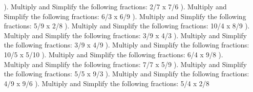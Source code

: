 \documentclass{article}%
\begin{document}
). Multiply and Simplify the following fractions: 2/7 x 7/6%
\newline%
\newline%
). Multiply and Simplify the following fractions: 6/3 x 6/9%
\newline%
\newline%
). Multiply and Simplify the following fractions: 5/9 x 2/8%
\newline%
\newline%
). Multiply and Simplify the following fractions: 10/4 x 8/9%
\newline%
\newline%
). Multiply and Simplify the following fractions: 3/9 x 4/3%
\newline%
\newline%
). Multiply and Simplify the following fractions: 3/9 x 4/9%
\newline%
\newline%
). Multiply and Simplify the following fractions: 10/5 x 5/10%
\newline%
\newline%
). Multiply and Simplify the following fractions: 6/4 x 9/8%
\newline%
\newline%
). Multiply and Simplify the following fractions: 7/7 x 5/9%
\newline%
\newline%
). Multiply and Simplify the following fractions: 5/5 x 9/3%
\newline%
\newline%
). Multiply and Simplify the following fractions: 4/9 x 9/6%
\newline%
\newline%
). Multiply and Simplify the following fractions: 5/4 x 2/8%
\newline%
\newline%
\newline%
\end{document}
